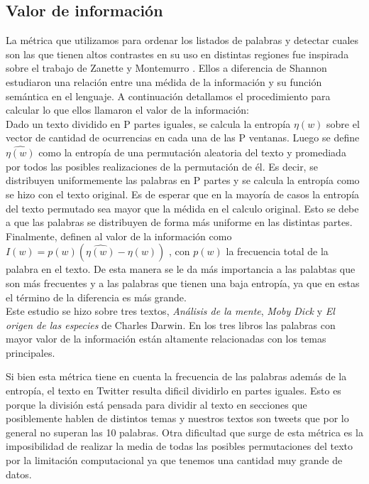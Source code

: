 \subsection{Valor de información}
La métrica que utilizamos para ordenar los listados de palabras y detectar cuales son
las que tienen altos contrastes en su uso en distintas regiones fue inspirada sobre el
trabajo de Zanette y Montemurro \cite{montemurro2010towards}.
Ellos a diferencia de Shannon estudiaron una relación entre una médida de la información y su función semántica en el lenguaje.
A continuación detallamos el procedimiento para calcular lo que ellos llamaron
el valor de la información: \\

Dado un texto dividido en P partes iguales, se calcula la entropía  $\eta(w)$ sobre el vector de cantidad de ocurrencias en cada una de las P ventanas.
Luego se define $\widehat{\eta(w)}$  como la entropía de una permutación aleatoria del texto y promediada por todos las posibles realizaciones de la permutación de él. 
Es decir, se distribuyen uniformemente las palabras en P partes y se calcula la
entropía como se hizo con el texto original. Es de esperar que en la mayoría de casos 
la entropía del texto permutado sea mayor que la médida en el calculo original. Esto 
se debe a que las palabras se distribuyen de forma más uniforme 
en las distintas partes.
Finalmente, definen al valor de la información como $I(w) = p(w) (\widehat{\eta(w)} - \eta(w))$ , con $p(w)$ la frecuencia total de la palabra en el texto. 
De esta manera se le da más importancia a las palabtas que son más frecuentes y a las palabras que tienen una baja entropía, ya que en estas el término de la diferencia es más grande.\\

Este estudio se hizo sobre tres textos, \textit{Análisis de la mente}, 
\textit{Moby Dick} y \textit{El origen de las especies} de Charles Darwin. 
En los tres libros las palabras con mayor valor de la información están 
altamente relacionadas con los temas principales.

Si bien esta métrica tiene en cuenta la frecuencia de las palabras además de la 
entropía, el texto en Twitter resulta dificil dividirlo en partes iguales. 
Esto es porque la división está pensada para dividir al texto en secciones que 
posiblemente hablen de distintos temas y nuestros textos son tweets que por lo general no superan las 10 palabras.
Otra dificultad que surge de esta métrica es la imposibilidad de realizar la media 
de todas las posibles permutaciones del texto por la limitación computacional ya que 
tenemos una cantidad muy grande de datos.


